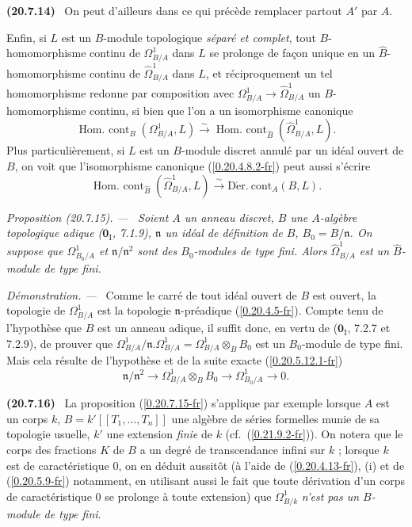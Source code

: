 \documentclass[10pt,oneside]{book}
\makeatletter
\newcommand{\sref}[1]{(\ref{#1})}
\newcommand{\setmanualcurrentlabel}[1]{\def\@currentlabel{#1}}
\newcommand{\oldpage}[2][]{%
  \setcounter{footnote}{0}%
  \marginpar{\scriptsize\textbf{#1}~|~#2}\ignorespaces}
\newenvironment{env}[1][]{\setmanualcurrentlabel{#1}\par\medskip\noindent\textbf{(#1)}\ }{\par}
\newenvironment{proposition}[1][]{%
  \setmanualcurrentlabel{#1}\par\medskip\noindent\itshape Proposition (#1). ---\ }{\par}
\newenvironment{proof}{%
  \par\medskip\noindent\textit{Démonstration. ---\ }}{\par}
\makeatother
\begin{document}
\begin{env}[20.7.14]
On peut d'ailleurs dans ce qui précède remplacer partout $A'$ par $A$.

Enfin, si $L$ est un $B$-module topologique \emph{séparé et complet}, tout
$B$-homomorphisme continu de $\Omega^1_{B/A}$ dans $L$ se prolonge de façon
unique en un $\widehat B$-homomorphisme continu de
$\widehat{\Omega}^1_{B/A}$ dans $L$, et réciproquement un tel homomorphisme
redonne par composition avec $\Omega^1_{B/A}\to\widehat{\Omega}^1_{B/A}$ un
$B$-homomorphisme continu, si bien que l'on a un isomorphisme canonique
\[
  \operatorname{Hom.\ cont}_B(\Omega^1_{B/A},L)\xrightarrow{\sim}
  \operatorname{Hom.\ cont}_{\widehat B}(\widehat{\Omega}^1_{B/A},L).
\]
Plus particulièrement, si $L$ est un $B$-module discret annulé par un idéal
ouvert de $B$, on voit que l'isomorphisme canonique
\sref{0.20.4.8.2-fr} peut aussi s'écrire
\begin{equation}
\tag{20.7.14.4}
\label{0.20.7.14.4-fr}
  \operatorname{Hom.\ cont}_{\widehat B}(\widehat{\Omega}^1_{B/A},L)
  \xrightarrow{\sim}\operatorname{D\acute{e}r.\ cont}_A(B,L).
\end{equation}
\end{env}

\begin{proposition}[20.7.15]
\label{0.20.7.15-fr}
Soient $A$ un anneau discret, $B$ une $A$-algèbre topologique adique
($\mathbf{0}_{\mathrm I}$, 7.1.9), $\mathfrak{n}$ un idéal de définition de
$B$, $B_0=B/\mathfrak{n}$. On suppose que $\Omega^1_{B_0/A}$ et
$\mathfrak{n}/\mathfrak{n}^2$ sont des $B_0$-modules de type fini. Alors
$\widehat{\Omega}^1_{B/A}$ est un $\widehat B$-module de type fini.
\end{proposition}

\begin{proof}
Comme le carré de tout idéal ouvert de $B$ est ouvert, la topologie de
$\Omega^1_{B/A}$ est la topologie $\mathfrak{n}$-préadique
\sref{0.20.4.5-fr}. Compte tenu de l'hypothèse que $B$ est un anneau adique,
il suffit donc, en vertu de ($\mathbf{0}_{\mathrm I}$, 7.2.7 et 7.2.9), de
prouver
\oldpage[0\textsubscript{IV-1}]{152}
que $\Omega^1_{B/A}/\mathfrak{n}.\Omega^1_{B/A}=
\Omega^1_{B/A}\otimes_B B_0$ est un $B_0$-module de type fini. Mais cela
résulte de l'hypothèse et de la suite exacte \sref{0.20.5.12.1-fr}
\[
  \mathfrak{n}/\mathfrak{n}^2\to
  \Omega^1_{B/A}\otimes_B B_0\to\Omega^1_{B_0/A}\to0.
\]
\end{proof}

\begin{env}[20.7.16]
\label{0.20.7.16-fr}
La proposition \sref{0.20.7.15-fr} s'applique par exemple lorsque $A$ est un
corps $k$, $B=k'[[T_1,\ldots,T_n]]$ une algèbre de séries formelles munie de
sa topologie usuelle, $k'$ une extension \emph{finie} de $k$ (cf.\
\sref{0.21.9.2-fr}). On notera que le corps des fractions $K$ de $B$ a un
degré de transcendance infini sur $k$ ; lorsque $k$ est de caractéristique
$0$, on en déduit aussitôt (à l'aide de \sref{0.20.4.13-fr}, (i) et de
\sref{0.20.5.9-fr} notamment, en utilisant aussi le fait que toute dérivation
d'un corps de caractéristique $0$ se prolonge à toute extension) que
$\Omega^1_{B/k}$ \emph{n'est pas un $B$-module de type fini}.
\end{env}
\end{document}
